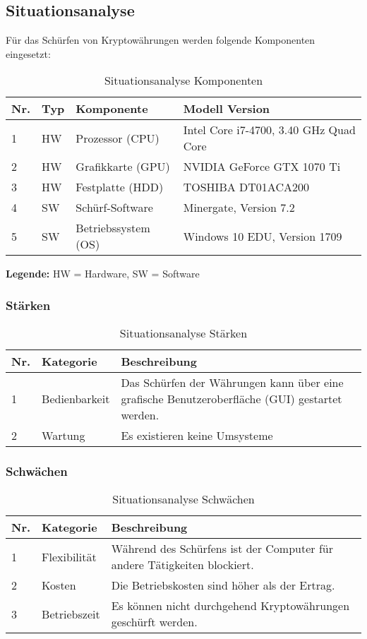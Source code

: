 \subsection{Situationsanalyse}
Für das Schürfen von Kryptowährungen werden folgende Komponenten eingesetzt:
\begin{table}[H]
\begin{tabular}[t]{p{0.5cm}p{0.8cm}p{6.7cm}p{6.7cm}}
\hline
\rowcolor{heading}\textbf{Nr.} & \textbf{Typ} & \textbf{Komponente} & \textbf{Modell \/Version} \\\hline
1 & HW & Prozessor (CPU) & Intel Core i7-4700, 3.40 GHz Quad Core \\\hline
2 & HW & Grafikkarte (GPU) & NVIDIA GeForce GTX 1070 Ti  \\\hline
3 & HW & Festplatte (HDD) & TOSHIBA DT01ACA200  \\\hline
4 & SW & Schürf-Software & Minergate, Version 7.2  \\\hline
5 & SW & Betriebssystem (OS) & Windows 10 EDU, Version 1709 \\\hline
\end{tabular}
\caption{Situationsanalyse Komponenten}
\end{table}


\textbf{Legende:} HW = Hardware, SW = Software

\subsubsection{Stärken}
\begin{table}[H]
\begin{tabular}[t]{p{0.5cm}p{4.1cm}p{10.1cm}}
\hline
\rowcolor{heading}\textbf{Nr.} & \textbf{Kategorie} & \textbf{Beschreibung} \\\hline
1 & Bedienbarkeit & Das Schürfen der Währungen kann über eine grafische Benutzeroberfläche (GUI) gestartet werden. \\\hline
2 & Wartung & Es existieren keine Umsysteme  \\\hline
\end{tabular}
\caption{Situationsanalyse Stärken}
\end{table}

\subsubsection{Schwächen}
\begin{table}[H]
\begin{tabular}[t]{p{0.5cm}p{4.1cm}p{10.1cm}}
\hline
\rowcolor{heading}\textbf{Nr.} & \textbf{Kategorie} & \textbf{Beschreibung} \\\hline
1 & Flexibilität & Während des Schürfens ist der Computer für andere Tätigkeiten blockiert. \\\hline
2 & Kosten & Die Betriebskosten sind höher als der Ertrag.  \\\hline
3 & Betriebszeit & Es können nicht durchgehend Kryptowährungen geschürft werden.  \\\hline
\end{tabular}
\caption{Situationsanalyse Schwächen}
\end{table}